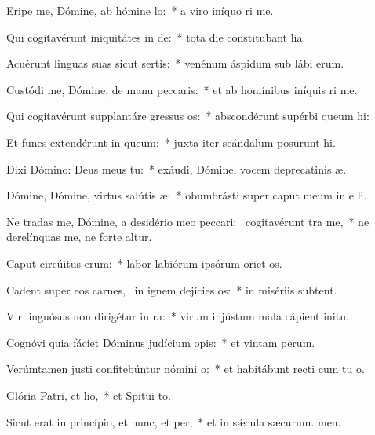 \item Eripe me, Dómine, ab hómine lo:~* a viro iníquo ri me.
\item Qui cogitavérunt iniquitátes in de:~* tota die constitubant lia.
\item Acuérunt linguas suas sicut sertis:~* venénum áspidum sub lábi erum.
\item Custódi me, Dómine, de manu peccaris:~* et ab homínibus iníquis ri me.
\item Qui cogitavérunt supplantáre gressus os:~* abscondérunt supérbi queum hi:
\item Et funes extendérunt in queum:~* juxta iter scándalum posurunt hi.
\item Dixi Dómino: Deus meus  tu:~* exáudi, Dómine, vocem deprecatinis æ.
\item Dómine, Dómine, virtus salútis æ:~* obumbrásti super caput meum in e li.
\item Ne tradas me, Dómine, a desidério meo peccari:~\pscross{} cogitavérunt tra me,~* ne derelínquas me, ne forte altur.
\item Caput circúitus erum:~* labor labiórum ipsórum oriet os.
\item Cadent super eos carnes,~\pscross{} in ignem dejícies os:~* in misériis  subtent.
\item Vir linguósus non dirigétur in ra:~* virum injústum mala cápient  initu.
\item Cognóvi quia fáciet Dóminus judícium opis:~* et vintam perum.
\item Verúmtamen justi confitebúntur nómini o:~* et habitábunt recti cum tu o.
\item Glória Patri, et lio,~* et Spitui to.
\item Sicut erat in princípio, et nunc, et per,~* et in sǽcula sæcurum. men.
